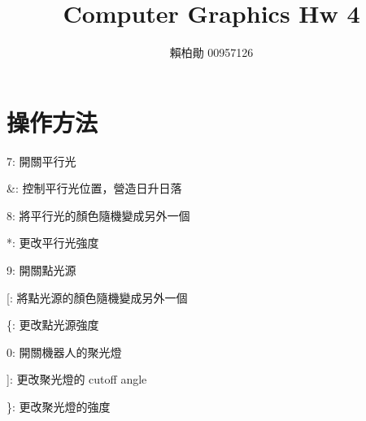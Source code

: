 \documentclass[a4,12pt]{article}
\title{Computer Graphics Hw 4}
\author{賴柏勛 00957126}
\begin{document}
    \maketitle
    \section{操作方法}

    7: 開關平行光

    \&: 控制平行光位置，營造日升日落

    8: 將平行光的顏色隨機變成另外一個

    *: 更改平行光強度

    9: 開關點光源

    [: 將點光源的顏色隨機變成另外一個

    \{: 更改點光源強度

    0: 開關機器人的聚光燈

    ]: 更改聚光燈的 cutoff angle

    \}: 更改聚光燈的強度 
    \newpage
\end{document}

